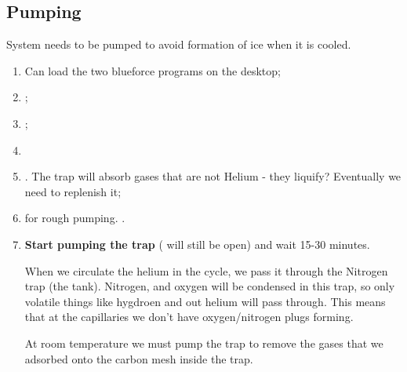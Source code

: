 \subsection{Pumping}
System needs to be pumped to avoid formation of ice when it is cooled.
\begin{enumerate}
\item Can load the two blueforce programs on the desktop;
\item {};
\item {};
\item {}
\item {}. The trap will absorb gases that are not
  Helium - they liquify? Eventually we need to replenish it;
\item {} for rough pumping. .
\item \textbf{Start pumping the  trap} 
  ( will still be open) and wait 15-30 minutes.
  	
  When we circulate the helium in the cycle,  we pass it through the Nitrogen trap (the tank).
  Nitrogen, and oxygen will  be condensed in this trap, so only  volatile things like hygdroen
  and  out helium  will  pass  through. This  means  that at  the  capillaries  we don't  have
  oxygen/nitrogen plugs forming.
  	
  At room  temperature we must  pump the trap  to remove the gases  that we adsorbed  onto the
  carbon mesh inside the trap.
  	
  	

\end{enumerate}
